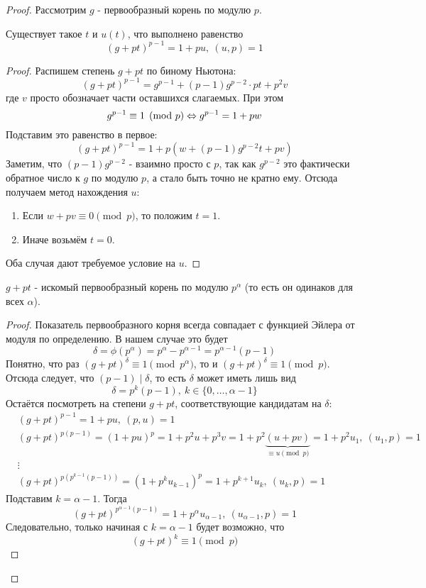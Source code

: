 \begin{proof}
	Рассмотрим $g$ - первообразный корень по модулю $p$.
	
	\begin{lemma}
		Существует такое $t$ и $u(t)$, что выполнено равенство
		\[
			(g + pt)^{p - 1} = 1 + pu,\ (u, p) = 1
		\]
	\end{lemma}

	\begin{proof}
		Распишем степень $g + pt$ по биному Ньютона:
		\[
			(g + pt)^{p - 1} = g^{p - 1} + (p - 1)g^{p - 2} \cdot pt + p^2 v
		\]
		где $v$ просто обозначает части оставшихся слагаемых. При этом
		\[
			g^{p - 1} \equiv 1 \pmod p \Leftrightarrow g^{p - 1} = 1 + pw
		\]
		Подставим это равенство в первое:
		\[
			(g + pt)^{p - 1} = 1 + p(w + (p - 1)g^{p - 2}t + pv)
		\]
		Заметим, что $(p - 1)g^{p - 2}$ - взаимно просто с $p$, так как $g^{p - 2}$ это фактически обратное число к $g$ по модулю $p$, а стало быть точно не кратно ему. Отсюда получаем метод нахождения $u$:
		\begin{enumerate}
			\item Если $w + pv \equiv 0 \pmod p$, то положим $t = 1$.
			\item Иначе возьмём $t = 0$.
		\end{enumerate}
		Оба случая дают требуемое условие на $u$.
	\end{proof}

	\begin{proposition}
		$g + pt$ - искомый первообразный корень по модулю $p^\alpha$ (то есть он одинаков для всех $\alpha$).
	\end{proposition}

	\begin{proof}
		Показатель первообразного корня всегда совпадает с функцией Эйлера от модуля по определению. В нашем случае это будет
		\[
			\delta = \phi(p^\alpha) = p^\alpha - p^{\alpha - 1} = p^{\alpha - 1}(p - 1)
		\]
		Понятно, что раз $(g + pt)^\delta \equiv 1 \pmod p^\alpha$, то и $(g + pt)^\delta \equiv 1 \pmod p$. Отсюда следует, что $(p - 1) \mid \delta$, то есть $\delta$ может иметь лишь вид
		\[
			\delta = p^k (p - 1),\ k \in \{0, \ldots, \alpha - 1\}
		\]
		Остаётся посмотреть на степени $g + pt$, соответствующие кандидатам на $\delta$:
		\begin{align*}
			&{(g + pt)^{p - 1} = 1 + pu,\ (p, u) = 1}
			\\
			&{(g + pt)^{p(p - 1)} = (1 + pu)^p = 1 + p^2u + p^3v = 1 + p^2\underbrace{(u + pv)}_{\equiv u \pmod p} = 1 + p^2u_1,\ (u_1, p) = 1}
			\\
			&{\vdots}
			\\
			&{(g + pt)^{p(p^{k - 1}(p - 1))} = (1 + p^k u_{k - 1})^p = 1 + p^{k + 1}u_k,\ (u_k, p) = 1}
		\end{align*}
		Подставим $k = \alpha - 1$. Тогда
		\[
			(g + pt)^{p^{\alpha - 1}(p - 1)} = 1 + p^\alpha u_{\alpha - 1},\ (u_{\alpha - 1}, p) = 1
		\]
		Следовательно, только начиная с $k = \alpha - 1$ будет возможно, что
		\[
			(g + pt)^k \equiv 1 \pmod p
		\]
	\end{proof}
\end{proof}

